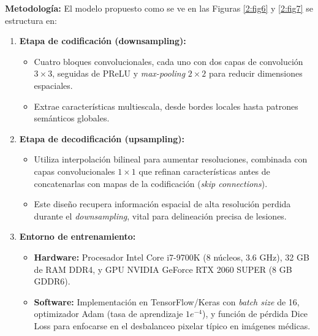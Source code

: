 \textbf{Metodología:}
El modelo propuesto como se ve en las Figuras \ref{2:fig6} y \ref{2:fig7} se estructura en:

\begin{enumerate}[label=\textbf{\arabic*.}, leftmargin=2em]
    \item \textbf{Etapa de codificación (downsampling):}
	\begin{itemize}
		\item Cuatro bloques convolucionales, cada uno con dos capas de convolución $3 \times 3$, seguidas de PReLU y \textit{max-pooling} $2 \times 2$ para reducir dimensiones espaciales.
		\item Extrae características multiescala, desde bordes locales hasta patrones semánticos globales.
	\end{itemize}

	\item \textbf{Etapa de decodificación (upsampling):}
	\begin{itemize}
		\item Utiliza interpolación bilineal para aumentar resoluciones, combinada con capas convolucionales $1 \times 1$ que refinan características antes de concatenarlas con mapas de la codificación (\textit{skip connections}).
		\item Este diseño recupera información espacial de alta resolución perdida durante el \textit{downsampling}, vital para delineación precisa de lesiones.
	\end{itemize}
	
	\item \textbf{Entorno de entrenamiento:}
	\begin{itemize}
		\item \textbf{Hardware:} Procesador Intel Core i7-9700K (8 núcleos, 3.6 GHz), 32 GB de RAM DDR4, y GPU NVIDIA GeForce RTX 2060 SUPER (8 GB GDDR6).
		\item \textbf{Software:} Implementación en TensorFlow/Keras con \textit{batch size} de 16, optimizador Adam (tasa de aprendizaje $1e^{-4}$), y función de pérdida Dice Loss para enfocarse en el desbalanceo pixelar típico en imágenes médicas.
	\end{itemize}
\end{enumerate}

